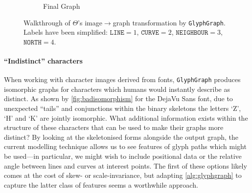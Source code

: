 \documentclass{mpaper}
\begin{document}
\begin{figure}
\begin{subfigure}[t]{0.3\linewidth}
{
		}
		\caption{Final Graph\label{fig:walkthrough:graph}}
	\end{subfigure}

	\vspace{0.5em}

	\caption{Walkthrough of $\Theta$'s image$\rightarrow$graph transformation by \texttt{GlyphGraph}. Labels have been simplified: $\mathtt{LINE}=1$, $\mathtt{CURVE}=2$, $\mathtt{NEIGHBOUR}=3$, $\mathtt{NORTH}=4$. \label{fig:walkthrough}}
\end{figure}

\paragraph{``Indistinct'' characters}
When working with character images derived from fonts, \texttt{GlyphGraph} produces isomorphic graphs for characters which humans would instantly describe as distinct.
As shown by \cref{fig:badisomorphism} for the DejaVu Sans font, due to unexpected ``tails'' and conjunctions within the binary skeletons the letters `Z', `H' and `K' are jointly isomorphic.
What additional information exists within the structure of these characters that can be used to make their graphs more distinct?
By looking at the skeletonised forms alongside the output graph, the current modelling technique allows us to see features of glyph paths which might be used---in particular, we might wish to include positional data or the relative angle between lines and curves at interest points.
The first of these options likely comes at the cost of skew- or scale-invariance, but adapting \cref{alg:glyphgraph} to capture the latter class of features seems a worthwhile approach.
\end{document}
